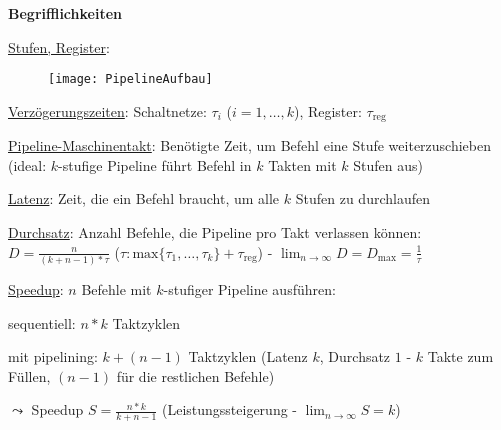 \textbf{Begrifflichkeiten}
\begin{items}
  \item \underline{Stufen, Register}:
  \begin{figure}[H]
    \centering
    \label{PipelineAufbau}
    \texttt{[image: PipelineAufbau]}
  \end{figure}

  \item \underline{Verzögerungszeiten}: Schaltnetze: $\tau_i$ ($i=1,\dots,k$), Register: $\tau_{\text{reg}}$

  \item \underline{Pipeline-Maschinentakt}: Benötigte Zeit, um Befehl eine Stufe weiterzuschieben (ideal: $k$-stufige Pipeline führt Befehl in $k$ Takten mit $k$ Stufen aus)
  \item \underline{Latenz}: Zeit, die ein Befehl braucht, um alle $k$ Stufen zu durchlaufen
  \item \underline{Durchsatz}: Anzahl Befehle, die Pipeline pro Takt verlassen können: $D=\tfrac{n}{(k+n-1)*\tau}$ ($\tau: \text{max}\{ \tau_1,\dots,\tau_k \} + \tau_\text{reg}$) - $\lim_{n \to \infty} D = D_\text{max} = \tfrac{1}{\tau}$
  \item \underline{Speedup}: $n$ Befehle mit $k$-stufiger Pipeline ausführen:
  \begin{enumeration}
    \item sequentiell: $n*k$ Taktzyklen
    \item mit pipelining: $k+(n-1)$ Taktzyklen (Latenz $k$, Durchsatz $1$ - $k$ Takte zum Füllen, $(n-1)$ für die restlichen Befehle)
  \end{enumeration}
  $\leadsto$ Speedup $S=\tfrac{n*k}{k+n-1}$ (Leistungssteigerung - $\lim_{n \to \infty}S=k$)
\end{items}

\newpage

